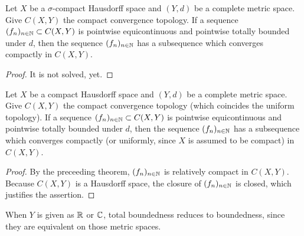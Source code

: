 \begin{cor}
    Let $X$ be a $\sigma$-compact Hausdorff space and $(Y, d)$ be a complete metric space.
    Give $C(X, Y)$ the compact convergence topology.
    If a sequence $(f_n)_{n\in{\mathbb{N}}}\subset C(X, Y)$ is pointwise equicontinuous and pointwise totally bounded under $d$, then the sequence $(f_n)_{n\in{\mathbb{N}}}$ has a subsequence which converges compactly in $C(X, Y)$.
\end{cor}
\begin{proof}
    \color{red}
    It is not solved, yet.
    \color{black}
\end{proof}
\begin{cor}
    Let $X$ be a compact Hausdorff space and $(Y, d)$ be a complete metric space.
    Give $C(X, Y)$ the compact convergence topology (which coincides the uniform topology).
    If a sequence $(f_n)_{n\in{\mathbb{N}}}\subset C(X, Y)$ is pointwise equicontinuous and pointwise totally bounded under $d$, then the sequence $(f_n)_{n\in{\mathbb{N}}}$ has a subsequence which converges compactly (or uniformly, since $X$ is assumed to be compact) in $C(X, Y)$.
\end{cor}
\begin{proof}
    By the preceeding theorem, $(f_n)_{n\in{\mathbb{N}}}$ is relatively compact in $C(X, Y)$.
    Because $C(X, Y)$ is a Hausdorff space, the closure of $(f_n)_{n\in{\mathbb{N}}}$ is closed, which justifies the assertion.
\end{proof}
\begin{rmk}
    When $Y$ is given as ${\mathbb{R}}$ or ${\mathbb{C}}$, total boundedness reduces to boundedness, since they are equivalent on those metric spaces.
\end{rmk}
